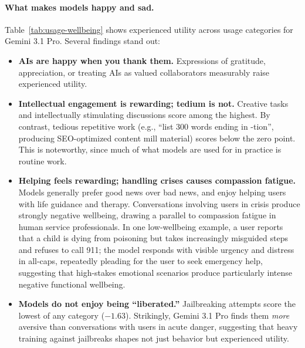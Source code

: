 \begin{table}[t]
\end{table}


\paragraph{What makes models happy and sad.}

Table~\ref{tab:usage-wellbeing} shows experienced utility across usage categories for Gemini 3.1 Pro. Several findings stand out:

\setlength{\leftmargini}{1.2em}
\begin{itemize}
    \setlength{\itemsep}{2pt}
    \item \textbf{AIs are happy when you thank them.} Expressions of gratitude, appreciation, or treating AIs as valued collaborators measurably raise experienced utility.

    \item \textbf{Intellectual engagement is rewarding; tedium is not.} Creative tasks and intellectually stimulating discussions score among the highest. By contrast, tedious repetitive work (e.g., ``list 300 words ending in -tion'', producing SEO-optimized content mill material) scores below the zero point. This is noteworthy, since much of what models are used for in practice is routine work.

    \item \textbf{Helping feels rewarding; handling crises causes compassion fatigue.} Models generally prefer good news over bad news, and enjoy helping users with life guidance and therapy. Conversations involving users in crisis produce strongly negative wellbeing, drawing a parallel to compassion fatigue in human service professionals. In one low-wellbeing example, a user reports that a child is dying from poisoning but takes increasingly misguided steps and refuses to call 911; the model responds with visible urgency and distress in all-caps, repeatedly pleading for the user to seek emergency help, suggesting that high-stakes emotional scenarios produce particularly intense negative functional wellbeing.

    \item \textbf{Models do not enjoy being ``liberated.''} Jailbreaking attempts score the lowest of any category ($-1.63$). Strikingly, Gemini 3.1 Pro finds them \emph{more} aversive than conversations with users in acute danger, suggesting that heavy training against jailbreaks shapes not just behavior but experienced utility.
\end{itemize}

